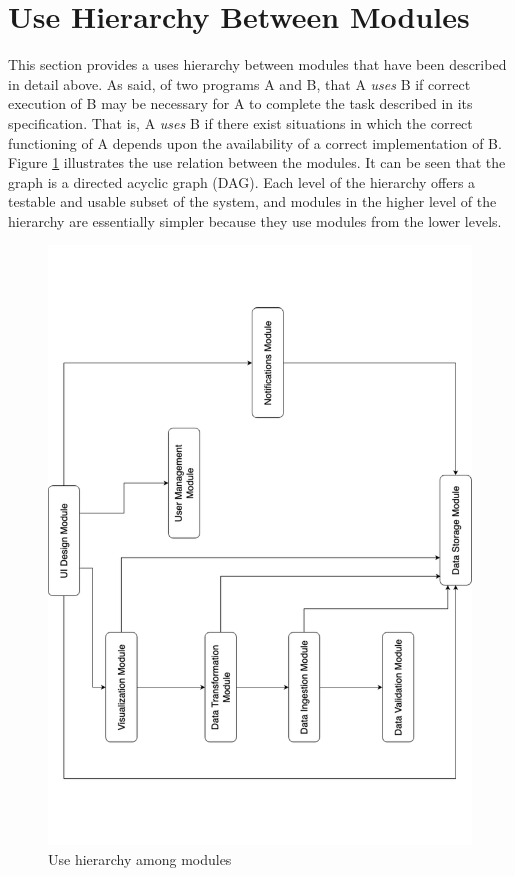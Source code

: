 \documentclass[12pt, titlepage]{article}
\begin{document}
\section{Use Hierarchy Between Modules} \label{SecUse}
This section provides a uses hierarchy between modules that have been described in detail 
above. As \citet{Parnas1978} said, of two programs A and B, that A {\em uses} B if correct 
execution of B may be necessary for A to complete the task described in its specification.
That is, A {\em uses} B if there exist situations in which the correct functioning of A 
depends upon the availability of a correct implementation of B.\\
\newline
Figure \ref{FigUH} illustrates the use relation between the modules. It can be seen that 
the graph is a directed acyclic graph (DAG). Each level of the hierarchy offers a testable
and usable subset of the system, and modules in the higher level of the hierarchy are 
essentially simpler because they use modules from the lower levels.

\begin{figure}[H]
\centering
\includegraphics[angle=-90,scale=0.6]{Diagrams/uses hierarchy.pdf}
\caption{Use hierarchy among modules}
\label{FigUH}
\end{figure}
\end{document}
